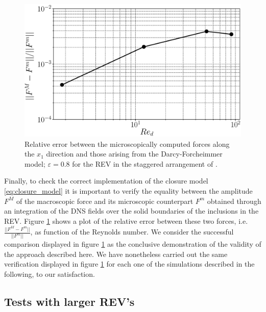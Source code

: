 \begin{figure}[h!]
	\centering
	\includegraphics[width=0.8\linewidth]{chapter_4/figure/macro_force}
	\caption{Relative error between the microscopically computed forces along the $x_1$ direction and those arising from the Darcy-Forcheimmer model; $\varepsilon=0.8$ for the REV in the staggered arrangement of \citet{yazdchi2011}.}
	\label{fig:force_comparison}
\end{figure}	
Finally, to check the correct implementation of the closure model \eqref{eq:closure_model} it is important to verify the equality between the amplitude $F^M$ of the macroscopic force and its microscopic counterpart $F^m$ obtained through an integration of the DNS fields over the solid boundaries of the inclusions in the REV. Figure \ref{fig:force_comparison} shows a plot of the relative error between these two forces, i.e. 
$\displaystyle \frac{||F^M-F^m||}{||F^m||}$, as function of the Reynolds number. We consider the successful comparison displayed in figure \ref{fig:force_comparison} 
as the conclusive demonstration of the validity of the approach described here. We have nonetheless carried out the same verification displayed in figure \ref{fig:force_comparison} for each one of the simulations described in the following, to our satisfaction.



\subsection{Tests with larger REV's}

